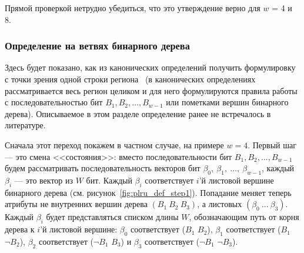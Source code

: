 Прямой проверкой нетрудно убедиться, что это утверждение верно для $w$ = 4 и 8.

\subsubsection{Определение \PseudoLRU на ветвях бинарного
дерева}\label{sec:PseudoLRUonBranches}

Здесь будет показано, как из канонических определений \PseudoLRU
получить формулировку \PseudoLRU с точки зрения одной строки региона~\cite{my_lomonosov_2010}
(в канонических определениях рассматривается весь регион целиком и
для него формулируются правила работы с последовательностью бит $B_1,
B_2, ..., B_{w{-}1}$ или пометками вершин бинарного дерева). Описываемое в этом разделе определение \PseudoLRU ранее не встречалось в литературе.

Сначала этот переход покажем в частном случае, на примере $w=4$. Первый шаг --- это
смена <<состояния>>: вместо последовательности бит $B_1, B_2, ...,
B_{w-1}$ будем рассматривать последовательность векторов бит
$\beta_0,~\beta_1,~\dots,~\beta_{w-1}$, каждый $\beta_i$ --- это вектор из $W$ бит. Каждый $\beta_i$ соответствует $i$'й листовой вершине бинарного дерева (см. рисунок~\ref{fig:plru_def_step1}). Попадание
меняет теперь атрибуты не внутренних вершин дерева $(B_1~B_2~B_3)$, а листовых $(\beta_0~...~\beta_3)$.
Каждый $\beta_i$ будет представляться списком длины $W$, обозначающим путь от
корня дерева к $i$'й листовой вершине: $\beta_0$ соответствует
($B_1$ $B_2$), $\beta_1$ соответствует ($B_1$ $\neg B_2$), $\beta_2$
соответствует ($\neg B_1$ $B_3$) и $\beta_3$ соответствует ($\neg
B_1$ $ \neg B_3$).\\[0.5cm]

